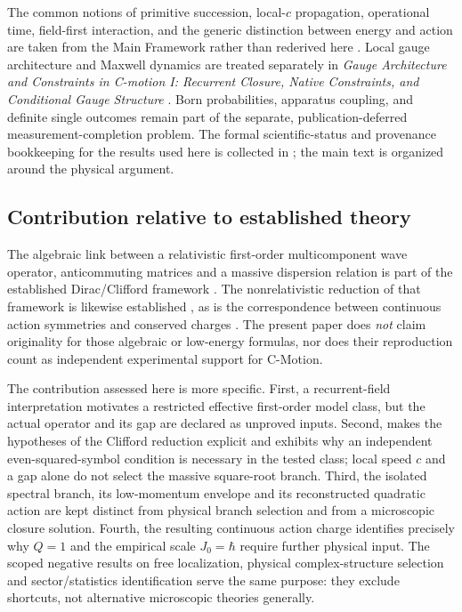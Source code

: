 \documentclass[11pt]{article}
\theoremstyle{definition}
\newcommand{\cmotion}{\mbox{C-Motion}}
\begin{document}
The common notions of primitive succession, local-$c$ propagation, operational time,
field-first interaction, and the generic distinction between energy and action are taken from
the Main Framework rather than rederived here \cite{CmotionMainFramework2026}.  Local gauge
architecture and Maxwell dynamics are treated separately in
\emph{Gauge Architecture and Constraints in C-motion I: Recurrent Closure,
Native Constraints, and Conditional Gauge Structure} \cite{CmotionSMStructureI2026}.  Born probabilities, apparatus coupling, and definite
single outcomes remain part of the separate, publication-deferred measurement-completion problem.  The formal scientific-status and provenance
bookkeeping for the results used here is collected in ; the main text is
organized around the physical argument.

\subsection{Contribution relative to established theory}
\label{sec:contribution}

The algebraic link between a relativistic first-order multicomponent wave
operator, anticommuting matrices and a massive dispersion relation is part of
the established Dirac/Clifford framework \cite{Dirac1928Electron,LawsonMichelsohn1989SpinGeometry}.
The nonrelativistic reduction of that framework is likewise established
\cite{FoldyWouthuysen1950,Sakurai2017Modern}, as is the correspondence between
continuous action symmetries and conserved charges \cite{Noether1918}.
The present paper does \emph{not} claim originality for those algebraic or
low-energy formulas, nor does their reproduction count as independent
experimental support for \cmotion{}.

The contribution assessed here is more specific.  First, a recurrent-field
interpretation motivates a restricted effective first-order model class,
but the actual operator and its gap are declared as unproved inputs.
Second,  makes the hypotheses of the
Clifford reduction explicit and exhibits why an independent even-squared-symbol
condition is necessary in the tested class; local speed $c$ and a gap alone do
not select the massive square-root branch.  Third, the isolated spectral
branch, its low-momentum envelope and its reconstructed quadratic action are
kept distinct from physical branch selection and from a microscopic closure
solution.  Fourth, the resulting continuous action charge identifies precisely
why $Q=1$ and the empirical scale $J_0=\hbar$ require further physical input.
The scoped negative results on free localization, physical complex-structure
selection and sector/statistics identification serve the same purpose: they
exclude shortcuts, not alternative microscopic theories generally.
\end{document}

